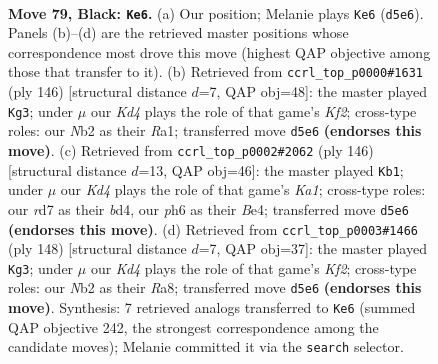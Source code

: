 \documentclass[11pt]{article}
\begin{document}
\clearpage

\begin{figure}[p]\centering
\begin{subfigure}{0.46\textwidth}\centering
\resizebox{\linewidth}{!}{%
\newchessgame
\chessboard[
  setfen={8/3R4/6pP/3k1p2/5P2/8/pn4K1/8 b - - 1 79},
  showmover=false,
  pgfstyle=straightmove, color=movearrow, markmove={d5-e6}
]}
\caption{}
\end{subfigure}\hfill
\begin{subfigure}{0.46\textwidth}\centering
\resizebox{\linewidth}{!}{%
\newchessgame
\chessboard[
  setfen={8/8/6p1/3k1pP1/5P2/8/2r2K2/R7 w - - 28 74},
  showmover=false,
  pgfstyle=straightmove, color=movearrow, markmove={f2-g3}
]}
\caption{}
\end{subfigure}
\\[4pt]
\begin{subfigure}{0.46\textwidth}\centering
\resizebox{\linewidth}{!}{%
\newchessgame
\chessboard[
  setfen={8/8/8/p7/Pp1bB3/1P6/3k4/K7 w - - 17 74},
  showmover=false,
  pgfstyle=straightmove, color=movearrow, markmove={a1-b1}
]}
\caption{}
\end{subfigure}\hfill
\begin{subfigure}{0.46\textwidth}\centering
\resizebox{\linewidth}{!}{%
\newchessgame
\chessboard[
  setfen={R7/5p1k/4p3/4P3/5PP1/8/1r3K2/8 w - - 65 75},
  showmover=false,
  pgfstyle=straightmove, color=movearrow, markmove={f2-g3}
]}
\caption{}
\end{subfigure}
\caption{\textbf{Move 79, Black: \texttt{Ke6}.} (a) Our position; Melanie plays \texttt{Ke6} (\texttt{d5e6}). Panels (b)--(d) are the retrieved master positions whose correspondence most drove this move (highest QAP objective among those that transfer to it). (b) Retrieved from \texttt{ccrl\_top\_p0000\#1631} (ply 146) [structural distance $d$=7, QAP obj=48]: the master played \texttt{Kg3}; under $\mu$ our \emph{Kd4} plays the role of that game's \emph{Kf2}; cross-type roles: our \emph{N}b2 as their \emph{R}a1; transferred move \texttt{d5e6} \textbf{(endorses this move)}. (c) Retrieved from \texttt{ccrl\_top\_p0002\#2062} (ply 146) [structural distance $d$=13, QAP obj=46]: the master played \texttt{Kb1}; under $\mu$ our \emph{Kd4} plays the role of that game's \emph{Ka1}; cross-type roles: our \emph{r}d7 as their \emph{b}d4, our \emph{p}h6 as their \emph{B}e4; transferred move \texttt{d5e6} \textbf{(endorses this move)}. (d) Retrieved from \texttt{ccrl\_top\_p0003\#1466} (ply 148) [structural distance $d$=7, QAP obj=37]: the master played \texttt{Kg3}; under $\mu$ our \emph{Kd4} plays the role of that game's \emph{Kf2}; cross-type roles: our \emph{N}b2 as their \emph{R}a8; transferred move \texttt{d5e6} \textbf{(endorses this move)}. Synthesis: 7 retrieved analogs transferred to \texttt{Ke6} (summed QAP objective 242, the strongest correspondence among the candidate moves); Melanie committed it via the \texttt{search} selector.}
\label{fig:thought-m157}
\end{figure}
\end{document}
